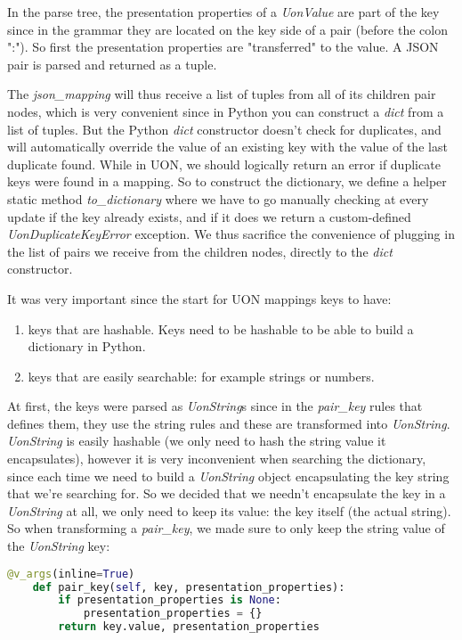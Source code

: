 \documentclass[12pt]{article}
\begin{document}
In the parse tree, the presentation properties of a \emph{UonValue} are part of the key since in the grammar they are located on the key side of a pair (before the colon ":"). So first the presentation properties are "transferred" to the value. A JSON pair is parsed and returned as a tuple. 

The \emph{json\_mapping} will thus receive a list of tuples from all of its children pair nodes, which is very convenient since in Python you can construct a \emph{dict} from a list of tuples. But the Python \emph{dict} constructor doesn't check for duplicates, and will automatically override the value of an existing key with the value of the last duplicate found. While in UON, we should logically return an error if duplicate keys were found in a mapping. So to construct the dictionary, we define a helper static method \emph{to\_dictionary} where we have to go manually checking at every update if the key already exists, and if it does we return a custom-defined \emph{UonDuplicateKeyError} exception. We thus sacrifice the convenience of plugging in the list of pairs we receive from the children nodes, directly to the \emph{dict} constructor.

It was very important since the start for UON mappings keys to have:
\begin{enumerate}
    \item keys that are hashable. Keys need to be hashable to be able to build a dictionary in Python.
    \item keys that are easily searchable: for example strings or numbers.
\end{enumerate}
At first, the keys were parsed as \emph{UonString}s since in the \emph{pair\_key} rules that defines them, they use the string rules and these are transformed into \emph{UonString}. \emph{UonString} is easily hashable (we only need to hash the string value it encapsulates), however it is very inconvenient when searching the dictionary, since each time we need to build a \emph{UonString} object encapsulating the key string that we're searching for. So we decided that we needn't encapsulate the key in a \emph{UonString} at all, we only need to keep its value: the key itself (the actual string). So when transforming a \emph{pair\_key}, we made sure to only keep the string value of the \emph{UonString} key:

\begin{lstlisting}[language=Python]
@v_args(inline=True)
    def pair_key(self, key, presentation_properties):
        if presentation_properties is None:
            presentation_properties = {}
        return key.value, presentation_properties
\end{lstlisting}
\end{document}
